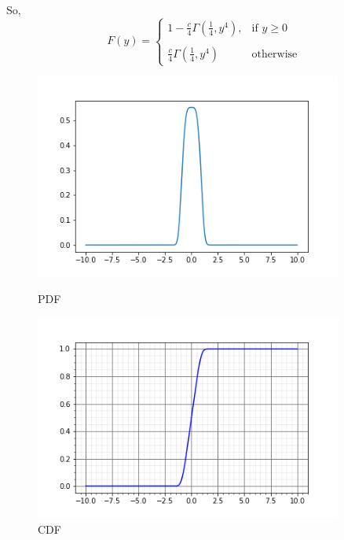 \documentclass{article}
\theoremstyle{remark}
\begin{document}
So,
\[
    F(y)= 
\begin{cases}
    1 - \frac{c}{4} \Gamma(\frac{1}{4},y^4),& \text{if } y\geq 0\\ \\
    \frac{c}{4} \Gamma(\frac{1}{4},y^4)              & \text{otherwise}
\end{cases}
\]

\begin{figure}
        \centering
        \includegraphics[width=0.9\textwidth]{PDF.png} %
        \caption{PDF}
        \centering
        \includegraphics[width=0.9\textwidth]{CDF.png} %
        \caption{CDF}
\end{figure}
\end{document}
